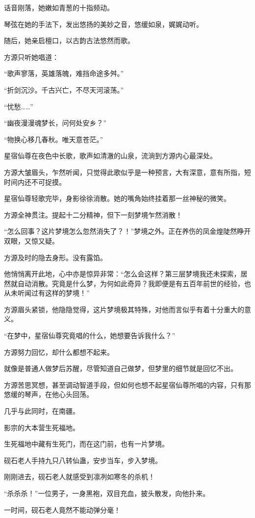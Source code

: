 \begin{this_body}
话音刚落，她嫩如青葱的十指频动。

琴弦在她的手法下，发出悠扬的美妙之音，悠缓如泉，娓娓动听。

随后，她亲启檀口，以古韵古法悠然而歌。

方源只听她唱道：

“歌声寥落，英雄落魄，难挡命途多舛。”

“折剑沉沙。千古兴亡，不尽天河滚荡。”

“忧愁……”

“幽夜漫漫魂梦长，问何处安乡？”

“物换心移几春秋。唯天意苍茫。”

星宿仙尊在夜色中长歌，歌声如清澈的山泉，流淌到方源内心最深处。

方源大皱眉头，乍然听闻，只觉得此歌似乎是一种预言，大有深意，意有所指，短时间内还不可捉摸。

星宿仙尊轻歌完毕，身影徐徐消散。她的嘴角始终挂着那一丝神秘的微笑。

方源全神贯注。提起十二分精神，但下一刻梦境乍然消散！

“怎么回事？这片梦境怎么忽然消失了？！”梦境之外。正在养伤的凤金煌陡然睁开双眼，又惊又疑。

方源及时的隐去身形。没有露馅。

他悄悄离开此地，心中亦是惊异非常：“怎么会这样？第三层梦境我还未探索，居然就自动消散。究竟是什么梦，为何如此奇异？我即便是有五百年前世的经验，也从未听闻过有这样的梦境！”

方源眉头紧锁，他隐隐觉得，这片梦境极其特殊，对他而言似乎有着十分重大的意义。

“在梦中，星宿仙尊究竟唱的什么，她想要告诉我什么？”

方源努力回忆，却什么都想不起来。

就像是普通人做梦后苏醒，尽管知道自己做梦，但梦里的细节就是回忆不出。

方源苦思冥想，甚至调动智道手段，但如何也想不起星宿仙尊所唱的内容，只有那悠缓的琴声，在他心头回荡。

几乎与此同时，在南疆。

影宗的大本营生死福地。

生死福地中藏有生死门，而在这门前，也有一片梦境。

砚石老人手持九只八转仙蛊，安步当车，步入梦境。

刚刚进去，砚石老人就感受到凛冽如寒冬的杀机！

“杀杀杀！”一位男子，一身黑袍，双目充血，披头散发，向他扑来。

一时间，砚石老人竟然不能动弹分毫！


\end{this_body}
